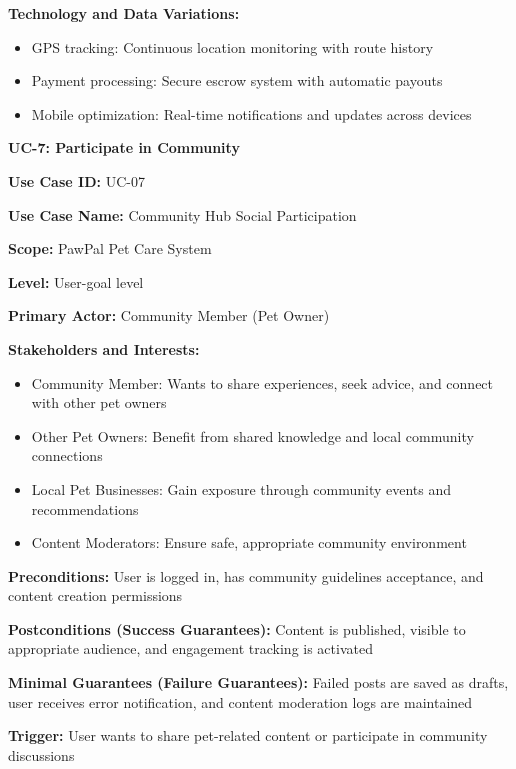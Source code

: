 \textbf{Technology and Data Variations:}
\begin{itemize}
    \item GPS tracking: Continuous location monitoring with route history
    \item Payment processing: Secure escrow system with automatic payouts

    \item Mobile optimization: Real-time notifications and updates across devices
\end{itemize}

\textbf{UC-7: Participate in Community}

\textbf{Use Case ID:} UC-07

\textbf{Use Case Name:} Community Hub Social Participation

\textbf{Scope:} PawPal Pet Care System

\textbf{Level:} User-goal level

\textbf{Primary Actor:} Community Member (Pet Owner)

\textbf{Stakeholders and Interests:}
\begin{itemize}
    \item Community Member: Wants to share experiences, seek advice, and connect with other pet owners
    \item Other Pet Owners: Benefit from shared knowledge and local community connections
    \item Local Pet Businesses: Gain exposure through community events and recommendations
    \item Content Moderators: Ensure safe, appropriate community environment
\end{itemize}

\textbf{Preconditions:} User is logged in, has community guidelines acceptance, and content creation permissions

\textbf{Postconditions (Success Guarantees):} Content is published, visible to appropriate audience, and engagement tracking is activated

\textbf{Minimal Guarantees (Failure Guarantees):} Failed posts are saved as drafts, user receives error notification, and content moderation logs are maintained

\textbf{Trigger:} User wants to share pet-related content or participate in community discussions

